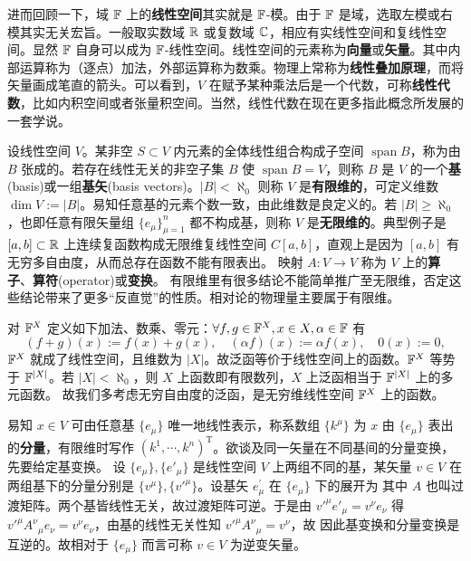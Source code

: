 进而回顾一下，域 $\mathbb{F}$ 上的\textbf{线性空间}其实就是 $\mathbb{F}$-模。由于 $\mathbb{F}$ 是域，选取左模或右模其实无关宏旨。一般取实数域 $\mathbb{R}$ 或复数域 $\mathbb{C}$，相应有实线性空间和复线性空间。显然 $\mathbb{F}$ 自身可以成为 $\mathbb{F}$-线性空间。线性空间的元素称为\textbf{向量}或\textbf{矢量}。其中内部运算称为（逐点）加法，外部运算称为数乘。物理上常称为\textbf{线性叠加原理}，而将矢量画成笔直的箭头。可以看到，$V$ 在赋予某种乘法后是一个代数，可称\textbf{线性代数}，比如内积空间或者张量积空间。当然，线性代数在现在更多指此概念所发展的一套学说。

设线性空间 $V$。某非空 $S\subset V$ 内元素的全体线性组合构成子空间 $\operatorname{span}B$，称为由 $B$ 张成的。若存在线性无关的非空子集 $B$ 使 $\operatorname{span}B=V$，则称 $B$ 是 $V$ 的一个\textbf{基}(basis)或一组\textbf{基矢}(basis vectors)。$|B|<\aleph_0$ 则称 $V$ 是\textbf{有限维的}，可定义维数 $\dim V:=|B|$。易知任意基的元素个数一致，由此维数是良定义的。若 $|B|\geqslant \aleph_0$，也即任意有限矢量组 $\{e_\mu\}_{\mu=1}^n$ 都不构成基，则称 $V$ 是\textbf{无限维的}。典型例子是 $[a, b] \subset \mathbb{R}$ 上连续复函数构成无限维复线性空间 $C[a, b]$，直观上是因为 $[a, b]$ 有无穷多自由度，从而总存在函数不能有限表出。
映射 $A:V\to V$ 称为 $V$ 上的\textbf{算子}、\textbf{算符}(operator)或\textbf{变换}。
有限维里有很多结论不能简单推广至无限维，否定这些结论带来了更多“反直觉”的性质。相对论的物理量主要属于有限维。

对 $\mathbb{F}^X$ 定义如下加法、数乘、零元：$\forall f,g\in \mathbb{F}^X,x\in X,\alpha\in\mathbb{F}$ 有
\[(f+g)(x):=f(x)+g(x),\quad (\alpha f)(x):=\alpha f(x),\quad 0(x):=0,\]
$\mathbb{F}^X$ 就成了线性空间，且维数为 $|X|$。故泛函等价于线性空间上的函数。$\mathbb{F}^X$ 等势于 $\mathbb{F}^{|X|}$。若 $|X|<\aleph_0$，则 $X$ 上函数即有限数列，$X$ 上泛函相当于 $\mathbb{F}^{|X|}$ 上的多元函数。
故我们多考虑无穷自由度的泛函，是无穷维线性空间 $\mathbb{F}^X$ 上的函数。

易知 $x\in V$ 可由任意基 $\{e_\mu\}$ 唯一地线性表示，称系数组 $\{k^\mu\}$ 为 $x$ 由 $\{e_\mu\}$ 表出的\textbf{分量}，有限维时写作 $(k^1,\cdots,k^n)^\mathrm{T}$。欲谈及同一矢量在不同基间的分量变换，先要给定基变换。
设 $\{e_\mu\},\{e'_\mu\}$ 是线性空间 $V$ 上两组不同的基，某矢量 $v\in V$ 在两组基下的分量分别是 $\{v^\mu\},\{v'^\mu\}$。设基矢 $e_\mu^{\prime}$ 在 $\{e_\mu\}$ 下的展开为
其中 $A$ 也叫过渡矩阵。两个基皆线性无关，故过渡矩阵可逆。于是由 $v'^\mu e'_\mu=v^\nu e_\nu$ 得 $v'^\mu A^\nu{ }_\mu e_\nu=v^\nu e_\nu$，由基的线性无关性知 $v'^\mu A^\nu{ }_\mu =v^\nu$，故
因此基变换和分量变换是互逆的。故相对于 $\{e_\mu\}$ 而言可称 $v\in V$ 为逆变矢量。

